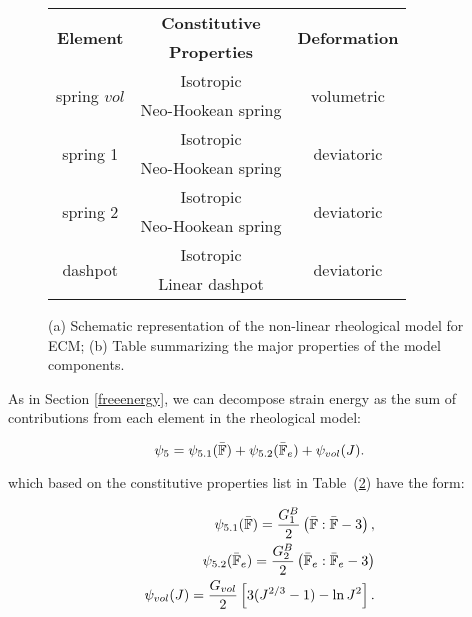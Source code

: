 \begin{figure}
	\begin{subfigure}{0.32\textwidth}
		\centering
		\large
		\def\svgwidth{0.9\linewidth}
		
		\caption{}
		\label{fig1B}
	\end{subfigure}
	\hspace{20mm}
	\begin{subtable}{0.375\textwidth}
		\hspace{-15mm}
		\begin{tabular}{|c | c | c|}	
			\hline
			\multirow{2}{*}{\textbf{ Element } }& \textbf{ Constitutive } & \multirow{2}{*}{\textbf{ Deformation }} \\
			& \textbf{Properties} &\\
			\hline	
			\multirow{2}{*}{ spring $vol$} & Isotropic  & 	\multirow{2}{*}{  volumetric }\\
			&Neo-Hookean spring&\\
			\hline
			\multirow{2}{*}{ spring 1 } & Isotropic  & 	\multirow{2}{*}{  deviatoric }\\
			&Neo-Hookean spring&\\
			\hline
			\multirow{2}{*}{ spring 2 } & Isotropic  & \multirow{2}{*}{  deviatoric }\\
			&Neo-Hookean spring &\\ 
			\hline
			\multirow{2}{*}{dashpot}  & Isotropic  & 	\multirow{2}{*}{deviatoric}\\
			& Linear dashpot & \\
			\hline
		\end{tabular}
		\caption{}
		\label{tabB}
	\end{subtable}
	\caption{(a) Schematic representation of the non-linear rheological model for ECM; (b) Table summarizing the major properties of the model components.}
\end{figure}

As in Section \ref{freeenergy}, we can decompose strain energy as the sum of contributions from each element in the rheological model:

\begin{equation}
\psi_5 = \psi_{5.1}(\bar{\mathbb{F}}) + \psi_{5.2}(\bar{\mathbb{F}}_e) + \psi_{vol}(J).
\end{equation}

which based on the constitutive properties list in Table~(\ref{tabB}) have the form:

\begin{eqnarray}
\psi_{5.1}(\bar{\mathbb{F}}) = \frac{G^B_1}{2} \left(\bar{\mathbb{F}}:\bar{\mathbb{F}} - 3\right),\\
\psi_{5.2}(\bar{\mathbb{F}}_e) = \frac{G^B_2}{2} \left(\bar{\mathbb{F}}_e:\bar{\mathbb{F}}_e - 3 \right)\\
\psi_{vol}(J) = \frac{G_{vol}}{2}\left[3(J^{2/3}-1) -\ln J^2\right].
\end{eqnarray}

